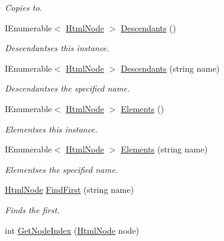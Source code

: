 \begin{DoxyCompactItemize}
\begin{DoxyCompactList}\small\item\em Copies to. \end{DoxyCompactList}\item 
I\+Enumerable$<$ \hyperlink{class_html_agility_pack_1_1_html_node}{Html\+Node} $>$ \hyperlink{class_html_agility_pack_1_1_html_node_collection_aa8d23d4ca8f0e1e908bcfb3966308b6b}{Descendants} ()
\begin{DoxyCompactList}\small\item\em Descendantses this instance. \end{DoxyCompactList}\item 
I\+Enumerable$<$ \hyperlink{class_html_agility_pack_1_1_html_node}{Html\+Node} $>$ \hyperlink{class_html_agility_pack_1_1_html_node_collection_a835992277dd1723c8d455c6c86471d87}{Descendants} (string name)
\begin{DoxyCompactList}\small\item\em Descendantses the specified name. \end{DoxyCompactList}\item 
I\+Enumerable$<$ \hyperlink{class_html_agility_pack_1_1_html_node}{Html\+Node} $>$ \hyperlink{class_html_agility_pack_1_1_html_node_collection_a7c9a4b4455711b8f79b226cf0ab37465}{Elements} ()
\begin{DoxyCompactList}\small\item\em Elementses this instance. \end{DoxyCompactList}\item 
I\+Enumerable$<$ \hyperlink{class_html_agility_pack_1_1_html_node}{Html\+Node} $>$ \hyperlink{class_html_agility_pack_1_1_html_node_collection_a99c9724ed530a887ca791f1d212c2569}{Elements} (string name)
\begin{DoxyCompactList}\small\item\em Elementses the specified name. \end{DoxyCompactList}\item 
\hyperlink{class_html_agility_pack_1_1_html_node}{Html\+Node} \hyperlink{class_html_agility_pack_1_1_html_node_collection_af301d90f14eac81200593013f0bc6929}{Find\+First} (string name)
\begin{DoxyCompactList}\small\item\em Finds the first. \end{DoxyCompactList}\item 
int \hyperlink{class_html_agility_pack_1_1_html_node_collection_a7c39a55ada5adcb1226f634406ba6c6a}{Get\+Node\+Index} (\hyperlink{class_html_agility_pack_1_1_html_node}{Html\+Node} node)

\end{DoxyCompactItemize}
